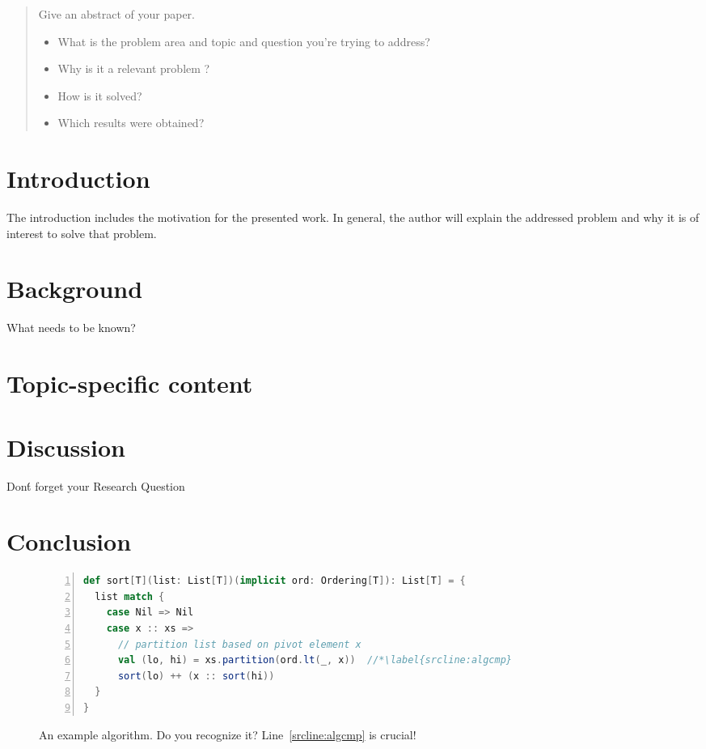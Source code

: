 
\begin{abstract}
    Give an abstract of your paper.
    \begin{itemize}
        \item What is the problem area and topic and question you're trying to address?
        \item Why is it a relevant problem ?
        \item How is it solved?
        \item Which results were obtained?
    \end{itemize}
\end{abstract}


\section{Introduction}
\label{sec:introduction}

    The introduction includes the motivation for the presented work.
    In general, the author will explain the addressed problem and why it is of interest to solve that problem.

\section{Background}
\label{sec:background}
    What needs to be known?

\section{Topic-specific content}
\label{sec:contentSummary}

\section{Discussion}
\label{sec:discussion}
    Don\'t forget your Research Question
    
\section{Conclusion}
\label{sec:conclusions}
    


\begin{figure}
\begin{lstlisting}[language=Scala,numbers=left]
def sort[T](list: List[T])(implicit ord: Ordering[T]): List[T] = {
  list match {
    case Nil => Nil
    case x :: xs =>
      // partition list based on pivot element x
      val (lo, hi) = xs.partition(ord.lt(_, x))  //*\label{srcline:algcmp}
      sort(lo) ++ (x :: sort(hi))
  }
}
\end{lstlisting}
\caption{An example algorithm. Do you recognize it? Line~\ref{srcline:algcmp} is crucial!}
\label{alg:example}
\end{figure}

